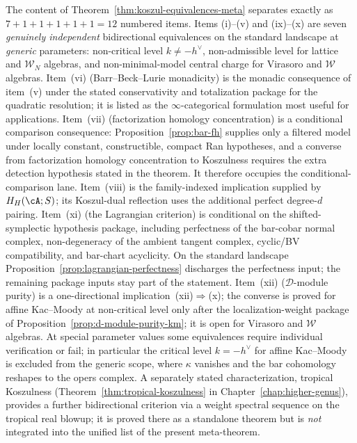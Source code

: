 \begin{remark}
\label{rem:koszul-equivalences-meta-scope}
The content of
Theorem~\ref{thm:koszul-equivalences-meta} separates exactly as
$7 + 1 + 1 + 1 + 1 + 1 = 12$ numbered items. Items
\textup{(i)--(v)} and \textup{(ix)--(x)} are seven
\emph{genuinely independent} bidirectional equivalences on the
standard landscape at
\emph{generic} parameters: non-critical level $k \neq -h^\vee$,
non-admissible level for lattice and $\mathcal{W}_N$ algebras,
and non-minimal-model central charge for Virasoro and
$\mathcal{W}$ algebras. Item~\textup{(vi)} (Barr--Beck--Lurie
monadicity) is the monadic consequence of item~\textup{(v)} under
the stated conservativity and totalization package for the quadratic
resolution; it is listed as the $\infty$-categorical formulation most
useful for applications.
Item~\textup{(vii)} (factorization homology concentration) is a
conditional comparison consequence: Proposition~\ref{prop:bar-fh}
supplies only a filtered model under locally constant,
constructible, compact Ran hypotheses, and a converse from
factorization homology concentration to Koszulness requires the
extra detection hypothesis stated in the theorem.  It therefore
occupies the conditional-comparison lane.
Item~\textup{(viii)} is the family-indexed implication supplied by
$H_H(\cA;S)$; its Koszul-dual reflection uses the additional perfect
degree-$d$ pairing. Item~\textup{(xi)} (the Lagrangian criterion)
is conditional on the shifted-symplectic hypothesis package, including
perfectness of the bar-cobar normal complex, non-degeneracy of the
ambient tangent complex, cyclic/BV compatibility, and bar-chart
acyclicity. On the standard landscape
Proposition~\ref{prop:lagrangian-perfectness} discharges the
perfectness input; the remaining package inputs stay part of the
statement. Item~\textup{(xii)}
($\mathcal{D}$-module purity) is a one-directional
implication~\textup{(xii)}$\Rightarrow$\textup{(x)}; the converse
is proved for affine Kac--Moody at non-critical level only after the
localization-weight package of
Proposition~\ref{prop:d-module-purity-km}; it is open for Virasoro
and $\mathcal{W}$ algebras.
At special parameter values some equivalences require individual
verification or fail; in particular the critical level
$k = -h^\vee$ for affine Kac--Moody is excluded from the generic
scope, where $\kappa$ vanishes and the bar cohomology reshapes to
the opers complex. A separately stated characterization,
tropical Koszulness
(Theorem~\ref{thm:tropical-koszulness} in
Chapter~\ref{chap:higher-genus}), provides a further
bidirectional criterion via a weight spectral sequence on the
tropical real blowup; it is proved there as a standalone theorem
but is \emph{not} integrated into the unified list of the present
meta-theorem.
\end{remark}

